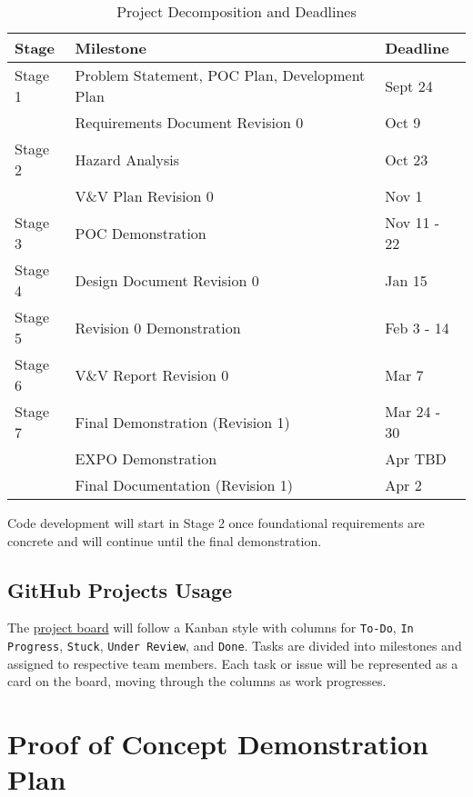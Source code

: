 \documentclass{article}
\begin{document}
\begin{table}[htbp]
    \centering
    \begin{tabular}{|l|l|l|}
    \hline
    \textbf{Stage} & \textbf{Milestone} & \textbf{Deadline} \\
    \hline
    Stage 1 & Problem Statement, POC Plan, Development Plan & Sept 24 \\
    \texttt{} & Requirements Document Revision 0 & Oct 9 \\
    \hline
    Stage 2 & Hazard Analysis & Oct 23 \\
    \texttt{} & V\&V Plan Revision 0 & Nov 1 \\
    \hline
    Stage 3 & POC Demonstration & Nov 11 - 22 \\
    \hline
    Stage 4 & Design Document Revision 0 & Jan 15 \\
    \hline
    Stage 5 & Revision 0 Demonstration & Feb 3 - 14\\
    \hline
    Stage 6 & V\&V Report Revision 0 & Mar 7 \\
    \hline
    Stage 7 & Final Demonstration (Revision 1) & Mar 24 - 30\\
    \texttt{} & EXPO Demonstration & Apr TBD \\
    \texttt{} & Final Documentation (Revision 1) & Apr 2 \\
    \hline
    \end{tabular}
    \caption{Project Decomposition and Deadlines}
    \label{table:2}
\end{table}

\noindent Code development will start in Stage 2 once foundational requirements are
concrete and will continue until the final demonstration.

\subsection{GitHub Projects Usage}

The \href{https://github.com/users/SumanyaG/projects/3}{project board} will follow a Kanban style with columns for \texttt{To-Do},
\texttt{In Progress}, \texttt{Stuck}, \texttt{Under Review}, and \texttt{Done}.
Tasks are divided into milestones and assigned to respective team members. Each
task or issue will be represented as a card on the board, moving through the
columns as work progresses.

\section{Proof of Concept Demonstration Plan}
\end{document}
